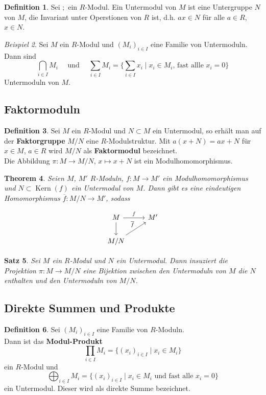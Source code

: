 \documentclass[10pt,a4paper]{article}
\newcommand{\ol}[1]{\overline{#1}}
\newcommand{\Kern}{\operatorname{Kern}}
\theoremstyle{plain}
\newtheorem{theorem}{Theorem}[section]
\newtheorem{satz}[theorem]{Satz}
\theoremstyle{definition}
\newtheorem{definition}[theorem]{Definition}
\theoremstyle{remark}
\newtheorem{exm}[theorem]{Beispiel}
\begin{document}
	\begin{definition}
		Sei $;$ ein $R$-Modul. Ein Untermodul von $M$ ist eine Untergruppe $N$ von $M$, die Invariant unter Operstionen von $R$ ist, d.h. $ax\in N$ für alle $a\in R$, $x\in N$.
	\end{definition}

	\begin{exm}
		Sei $M$ ein $R$-Modul und $(M_i)_{i\in I}$ eine Familie von Untermoduln. Dann sind
		\[\bigcap_{i\in I}M_i\quad\text{ und }\quad \sum_{i\in I}M_i=\{\sum_{i\in I}x_i\mid x_i\in M_i\text{, fast allle $x_i=0$}\}\]
		Untermoduln von $M$.
	\end{exm}
	
	\subsection{Faktormoduln}
	\begin{definition}
		Sei $M$ ein $R$-Modul und $N\subset M$ ein Untermodul, so erhält man auf der \textbf{Faktorgruppe} $M/N$ eine $R$-Modulstruktur. Mit $a(x+N)=ax+N$ für $x\in M$, $a\in R$ wird $M/N$ als \textbf{Faktormodul} bezeichnet.\\
		Die Abbildung $\pi:M\to M/N$, $x\mapsto x+N$ ist ein Modulhomomorphismus.
	\end{definition}

	\begin{theorem}
		Seien $M$, $M'$ $R$-Moduln, $f:M\to M'$ ein Modulhomomorphismus und $N\subset\Kern(f)$ ein Untermodul von $M$. Dann gibt es eine eindeutigen Homomorphismus $\ol f:M/N\to M'$, sodass
		\begin{figure}[h]
			\centering
			\[\begin{tikzcd}
				M\ar[r,"f"]\ar[d]& M'\\
				M/N\ar[ur,"\ol f"]&
			\end{tikzcd}\]
		\end{figure}
	\end{theorem}

	\begin{satz}
		Sei $M$ ein $R$-Modul und $N$ ein Untermodul. Dann insuziert die Projektion $\pi:M\to M/N$ eine Bijektion zwischen den Untermoduln von $M$ die $N$ enthalten und den Untermoduln von $M/N$.
	\end{satz}

	\subsection{Direkte Summen und Produkte}
	\begin{definition}
		Sei $(M_i)_{i\in I}$ eine Familie von $R$-Moduln. \\
		Dann ist das \textbf{Modul-Produkt}
		\[\prod_{i\in I}M_i=\{(x_i)_{i\in I}\mid x_i\in M_i\}\]
		ein $R$-Modul und
		\[\bigoplus_{i\in I}M_i=\{(x_i)_{i\in I}\mid x_i\in M_i\text{ und fast alle $x_i=0$}\}\]
		ein Untermodul. Dieser wird als direkte Summe bezeichnet.
	\end{definition}
\end{document}
